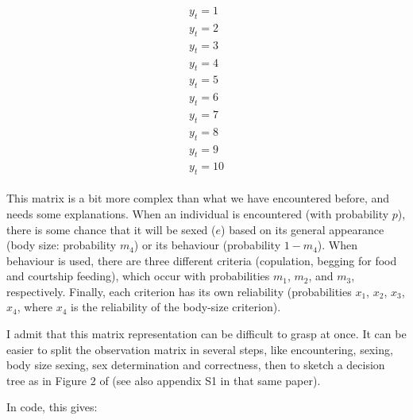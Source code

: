 \documentclass[
  12pt,
]{krantz}
\begin{document}
\[\begin{matrix}
\begin{matrix}
y_{t}=1 \\ y_{t}=2 \\ y_{t}=3 \\ y_{t}=4 \\ y_{t}=5 \\ y_{t}=6 \\ y_{t}=7 \\ y_{t}=8 \\ y_{t}=9 \\ y_{t}=10
\end{matrix}
\end{matrix}\]

This matrix is a bit more complex than what we have encountered before, and needs some explanations. When an individual is encountered (with probability \(p\)), there is some chance that it will be sexed (\(e\)) based on its general appearance (body size: probability \(m_4\)) or its behaviour (probability \(1 - m_4\)). When behaviour is used, there are three different criteria (copulation, begging for food and courtship feeding), which occur with probabilities \(m_1\), \(m_2\), and \(m_3\), respectively. Finally, each criterion has its own reliability (probabilities \(x_1\), \(x_2\), \(x_3\), \(x_4\), where \(x_4\) is the reliability of the body-size criterion).

I admit that this matrix representation can be difficult to grasp at once. It can be easier to split the observation matrix in several steps, like encountering, sexing, body size sexing, sex determination and correctness, then to sketch a decision tree as in Figure 2 of \citet{genovart_exploiting_2012} (see also appendix S1 in that same paper).

In code, this gives:
\end{document}
